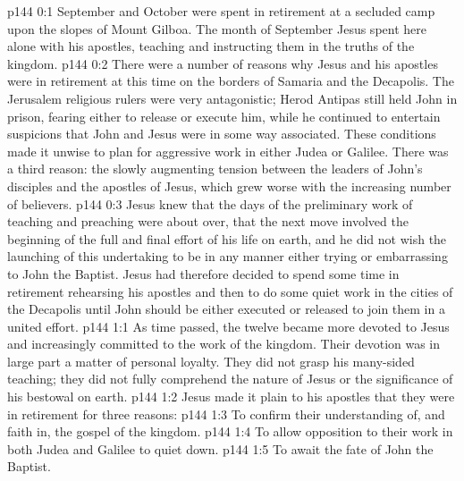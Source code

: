 \author{Midwayer Commission}
\vs p144 0:1 September and October were spent in retirement at a secluded camp upon the slopes of Mount Gilboa. The month of September Jesus spent here alone with his apostles, teaching and instructing them in the truths of the kingdom.
\vs p144 0:2 There were a number of reasons why Jesus and his apostles were in retirement at this time on the borders of Samaria and the Decapolis. The Jerusalem religious rulers were very antagonistic; Herod Antipas still held John in prison, fearing either to release or execute him, while he continued to entertain suspicions that John and Jesus were in some way associated. These conditions made it unwise to plan for aggressive work in either Judea or Galilee. There was a third reason: the slowly augmenting tension between the leaders of John’s disciples and the apostles of Jesus, which grew worse with the increasing number of believers.
\vs p144 0:3 Jesus knew that the days of the preliminary work of teaching and preaching were about over, that the next move involved the beginning of the full and final effort of his life on earth, and he did not wish the launching of this undertaking to be in any manner either trying or embarrassing to John the Baptist. Jesus had therefore decided to spend some time in retirement rehearsing his apostles and then to do some quiet work in the cities of the Decapolis until John should be either executed or released to join them in a united effort.
\vs p144 1:1 As time passed, the twelve became more devoted to Jesus and increasingly committed to the work of the kingdom. Their devotion was in large part a matter of personal loyalty. They did not grasp his many\hyp{}sided teaching; they did not fully comprehend the nature of Jesus or the significance of his bestowal on earth.
\vs p144 1:2 Jesus made it plain to his apostles that they were in retirement for three reasons:
\vs p144 1:3 \bibnobreakspace To confirm their understanding of, and faith in, the gospel of the kingdom.
\vs p144 1:4 \bibnobreakspace To allow opposition to their work in both Judea and Galilee to quiet down.
\vs p144 1:5 \bibnobreakspace To await the fate of John the Baptist.

